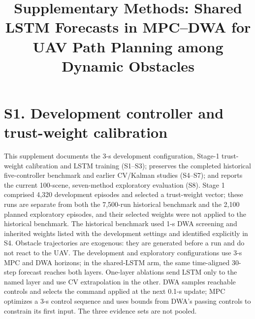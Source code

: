\documentclass[10pt]{article}
\title{Supplementary Methods: Shared LSTM Forecasts in MPC--DWA for UAV Path Planning among Dynamic Obstacles}
\author{}
\date{}
\begin{document}
\maketitle
\renewcommand{\thetable}{S\arabic{table}}
\renewcommand{\thefigure}{S\arabic{figure}}
\renewcommand{\theequation}{S\arabic{equation}}

\section*{S1. Development controller and trust-weight calibration}
This supplement documents the 3-s development configuration, Stage-1 trust-weight calibration and LSTM training (S1--S3); preserves the completed historical five-controller benchmark and earlier CV/Kalman studies (S4--S7); and reports the current 100-scene, seven-method exploratory evaluation (S8). Stage 1 comprised 4,320 development episodes and selected a trust-weight vector; these runs are separate from both the 7,500-run historical benchmark and the 2,100 planned exploratory episodes, and their selected weights were not applied to the historical benchmark. The historical benchmark used 1-s DWA screening and inherited weights listed with the development settings and identified explicitly in S4. Obstacle trajectories are exogenous: they are generated before a run and do not react to the UAV. The development and exploratory configurations use 3-s MPC and DWA horizons; in the shared-LSTM arm, the same time-aligned 30-step forecast reaches both layers. One-layer ablations send LSTM only to the named layer and use CV extrapolation in the other. DWA samples reachable controls and selects the command applied at the next 0.1-s update; MPC optimizes a 3-s control sequence and uses bounds from DWA's passing controls to constrain its first input. The three evidence sets are not pooled.
\end{document}
